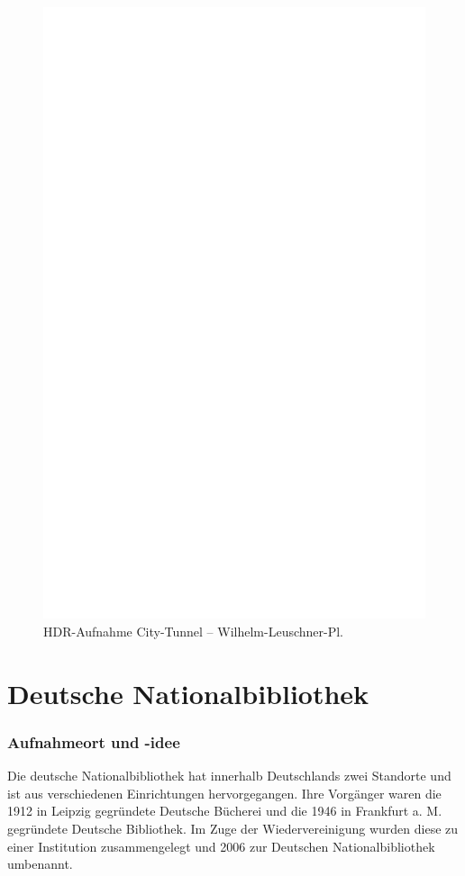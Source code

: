 \documentclass[liststotoc,bibtotoc,fontsize=14pt,]{scrreprt}
\begin{document}
			 \newpage
			 \begin{figure}[h]
			 	\includegraphics[width=\linewidth]{img/ph.jpg}
			 	\caption{HDR-Aufnahme City-Tunnel -- Wilhelm-Leuschner-Pl. }
			 \end{figure}


	\section{Deutsche Nationalbibliothek}
	\label{sec:bibo}
	\subsubsection{Aufnahmeort und -idee}
Die deutsche Nationalbibliothek hat innerhalb Deutschlands zwei Standorte und ist aus verschiedenen Einrichtungen hervorgegangen. Ihre Vorgänger waren die 1912 in Leipzig gegründete Deutsche Bücherei und die 1946 in Frankfurt a. M. gegründete Deutsche Bibliothek. Im Zuge der Wiedervereinigung wurden diese zu einer Institution zusammengelegt und 2006 zur Deutschen Nationalbibliothek umbenannt. 
\end{document}
